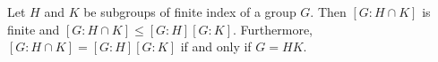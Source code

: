 \begin{proposition}
Let $H$ and $K$ be subgroups of finite index of a group $G$. Then $[G : H \cap K]$ is finite and $[G : H \cap K] \leq [G : H][G : K]$. Furthermore, $[G : H \cap K] = [G : H][G : K]$ if and only if $G = HK$.
\end{proposition}

